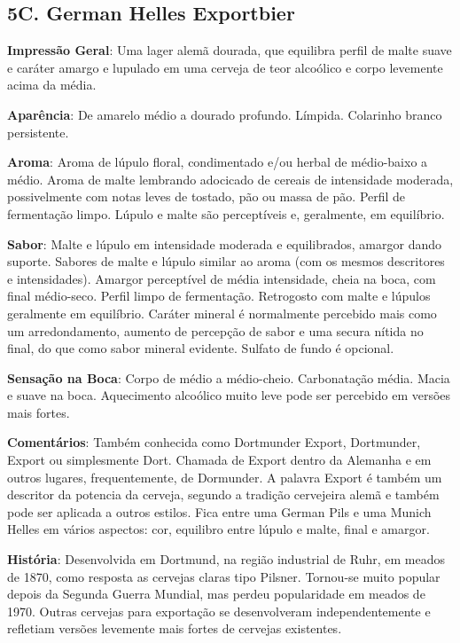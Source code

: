 \subsection*{5C. German Helles Exportbier}

\textbf{Impressão Geral}: Uma lager alemã dourada, que equilibra perfil de malte suave e caráter amargo e lupulado em uma cerveja de teor alcoólico e corpo levemente acima da média.

\textbf{Aparência}: De amarelo médio a dourado profundo. Límpida. Colarinho branco persistente.

\textbf{Aroma}: Aroma de lúpulo floral, condimentado e/ou herbal de médio-baixo a médio. Aroma de malte lembrando adocicado de cereais de intensidade moderada, possivelmente com notas leves de tostado, pão ou massa de pão. Perfil de fermentação limpo. Lúpulo e malte são perceptíveis e, geralmente, em equilíbrio.

\textbf{Sabor}: Malte e lúpulo em intensidade moderada e equilibrados, amargor dando suporte. Sabores de malte e lúpulo similar ao aroma (com os mesmos descritores e intensidades). Amargor perceptível de média intensidade, cheia na boca, com final médio-seco. Perfil limpo de fermentação. Retrogosto com malte e lúpulos geralmente em equilíbrio. Caráter mineral é normalmente percebido mais como um arredondamento, aumento de percepção de sabor e uma secura nítida no final, do que como sabor mineral evidente. Sulfato de fundo é opcional.

\textbf{Sensação na Boca}: Corpo de médio a médio-cheio. Carbonatação média. Macia e suave na boca. Aquecimento alcoólico muito leve pode ser percebido em versões mais fortes.

\textbf{Comentários}: Também conhecida como Dortmunder Export, Dortmunder, Export ou simplesmente Dort. Chamada de Export dentro da Alemanha e em outros lugares, frequentemente, de Dormunder. A palavra Export é também um descritor da potencia da cerveja, segundo a tradição cervejeira alemã e também pode ser aplicada a outros estilos. Fica entre uma German Pils e uma Munich Helles em vários aspectos: cor, equilibro entre lúpulo e malte, final e amargor.

\textbf{História}: Desenvolvida em Dortmund, na região industrial de Ruhr, em meados de 1870, como resposta as cervejas claras tipo Pilsner. Tornou-se muito popular depois da Segunda Guerra Mundial, mas perdeu popularidade em meados de 1970. Outras cervejas para exportação se desenvolveram independentemente e refletiam versões levemente mais fortes de cervejas existentes.

